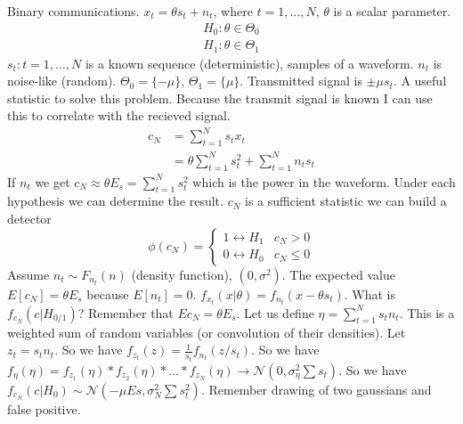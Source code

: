 \documentclass[a4paper]{article}
\begin{document}
Binary communications. $x_t = \theta s_t + n_t$, where $t = 1, \dots, N$, $\theta$ is a scalar parameter. 
\[
    \begin{aligned}
 H_0: \theta \in \Theta_0 \\
 H_1: \theta \in \Theta_1       
    \end{aligned}
\]
$s_t: t = 1, \dots, N$ is a known sequence (deterministic), samples of a waveform. $n_t$ is noise-like (random). $\Theta_0 = \{-\mu\}$, $\Theta_1 = \{\mu\}$. Transmitted signal is $\pm \mu s_t$. A useful statistic to solve this problem. Because the transmit signal is known I can use this to correlate with the recieved signal. 
\[
    \begin{aligned}
        c_N &= \sum_{t=1}^N s_tx_t \\
            &= \theta \sum_{t=1}^N s_t^2 +  \sum_{t=1}^N n_ts_t
    \end{aligned}
\]
If $n_t$ we get $c_N \approx \theta E_s = \sum_{t=1}^N s_t^2$ which is the power in the waveform. Under each hypothesis we can determine the result. $c_N$ is a sufficient statistic  we can build a detector
\[
    \phi(c_N) = 
    \begin{cases}
        1 \leftrightarrow H_1 & c_N > 0 \\ 
        0 \leftrightarrow H_0 & c_N \leq 0
    \end{cases}
\]
Assume $n_t \sim F_{n_t}(n)$ (density function), $(0, \sigma^2)$. The expected value $E[c_N] = \theta E_s$ because $E[n_t] = 0$. $f_{x_t}(x | \theta) = f_{n_t}(x - \theta s_t)$. What is $f_{c_N}(c | H_{0/1})$? Remember that $E{c_N} = \theta E_s$. Let us define $\eta = \sum_{t=1}^N s_tn_t$. This is a weighted sum of random variables (or convolution of their densities). Let $z_t = s_tn_t$. So we have $f_{z_t}(z) = \frac{1}{s_t} f_{n_t}(z/s_t)$. So we have $f_{\eta}( \eta) = f_{z_1}(\eta) * f_{z_2}(\eta) * \dots * f_{z_N}(\eta) \rightarrow \mathcal{N}(0, \sigma_{\eta}^2 \sum s_t)$. So we have $f_{c_N}(c| H_0) \sim \mathcal{N}(-\mu Es, \sigma_N^2 \sum s_t^2)$. Remember drawing of two gaussians and false positive.
\end{document}
